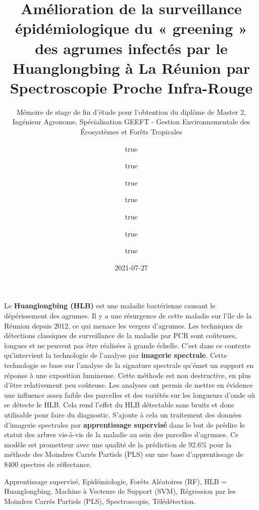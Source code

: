 \documentclass[
  11pt,
  french,
  a4paper,
  extrafontsizes,onecolumn,openright
  ]{memoir}
\title{Amélioration de la surveillance épidémiologique du « greening » des agrumes infectés par le Huanglongbing à La Réunion par Spectroscopie Proche Infra-Rouge}
\subtitle{Mémoire de stage de fin d'étude pour l'obtention du diplôme de Master 2, Ingénieur Agronome, Spécialisation GEEFT - Gestion Environnementale des Écosystèmes et Forêts Tropicales}
\author{true \and true \and true \and true \and true \and true \and true}
\date{2021-07-27}
\begin{document}
\frontmatter



\cleardoublepage



\begin{description}

\item[Résumé:]
Le \textbf{Huanglongbing (HLB)} est une maladie bactérienne causant le dépérissement des agrumes. Il y a une résurgence de cette maladie sur l'île de la Réunion depuis 2012, ce qui menace les vergers d'agrumes. Les techniques de détections classiques de surveillance de la maladie par PCR sont coûteuses, longues et ne peuvent pas être réalisées à grande échelle. C'est dans ce contexte qu'intervient la technologie de l'analyse par \textbf{imagerie spectrale}. Cette technologie se base sur l'analyse de la signature spectrale qu'émet un support en réponse à une exposition lumineuse. Cette méthode est non destructive, en plus d'être relativement peu coûteuse. Les analyses ont permis de mettre en évidence une influence assez faible des parcelles et des variétés sur les longueurs d'onde où se détecte le HLB. Cela rend l'effet du HLB détectable sans bruits et donc utilisable pour faire du diagnostic. S'ajoute à cela un traitement des données d'imagerie spectrales par \textbf{apprentissage supervisé} dans le but de prédire le statut des arbres vis-à-vis de la maladie au sein des parcelles d'agrumes. Ce modèle est prometteur avec une qualité de la prédiction de 92.6\% pour la méthode des Moindres Carrés Partiels (PLS) sur une base d'apprentissage de 8400 spectres de réflectance.

\item[Mots clés :]
Apprentissage supervisé, Epidémiologie, Forêts Aléatoires (RF), HLB = Huanglongbing, Machine à Vecteurs de Support (SVM), Régression par les Moindres Carrés Partiels (PLS), Spectroscopie, Télédétection.


\end{description}
\end{document}
